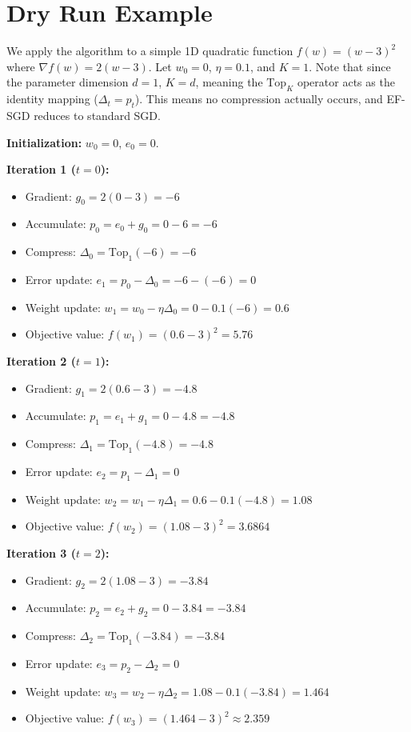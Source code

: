 \documentclass{article}
\begin{document}
\section*{Dry Run Example}
We apply the algorithm to a simple 1D quadratic function $f(w) = (w-3)^2$ where $\nabla f(w) = 2(w-3)$. 
Let $w_0 = 0$, $\eta = 0.1$, and $K=1$. Note that since the parameter dimension $d=1$, $K=d$, meaning the $\text{Top}_K$ operator acts as the identity mapping ($\Delta_t = p_t$). This means no compression actually occurs, and EF-SGD reduces to standard SGD.

\textbf{Initialization:} $w_0 = 0$, $e_0 = 0$.

\textbf{Iteration 1 ($t=0$):}
\begin{itemize}
    \item Gradient: $g_0 = 2(0 - 3) = -6$
    \item Accumulate: $p_0 = e_0 + g_0 = 0 - 6 = -6$
    \item Compress: $\Delta_0 = \text{Top}_1(-6) = -6$
    \item Error update: $e_1 = p_0 - \Delta_0 = -6 - (-6) = 0$
    \item Weight update: $w_1 = w_0 - \eta \Delta_0 = 0 - 0.1(-6) = 0.6$
    \item Objective value: $f(w_1) = (0.6 - 3)^2 = 5.76$
\end{itemize}

\textbf{Iteration 2 ($t=1$):}
\begin{itemize}
    \item Gradient: $g_1 = 2(0.6 - 3) = -4.8$
    \item Accumulate: $p_1 = e_1 + g_1 = 0 - 4.8 = -4.8$
    \item Compress: $\Delta_1 = \text{Top}_1(-4.8) = -4.8$
    \item Error update: $e_2 = p_1 - \Delta_1 = 0$
    \item Weight update: $w_2 = w_1 - \eta \Delta_1 = 0.6 - 0.1(-4.8) = 1.08$
    \item Objective value: $f(w_2) = (1.08 - 3)^2 = 3.6864$
\end{itemize}

\textbf{Iteration 3 ($t=2$):}
\begin{itemize}
    \item Gradient: $g_2 = 2(1.08 - 3) = -3.84$
    \item Accumulate: $p_2 = e_2 + g_2 = 0 - 3.84 = -3.84$
    \item Compress: $\Delta_2 = \text{Top}_1(-3.84) = -3.84$
    \item Error update: $e_3 = p_2 - \Delta_2 = 0$
    \item Weight update: $w_3 = w_2 - \eta \Delta_2 = 1.08 - 0.1(-3.84) = 1.464$
    \item Objective value: $f(w_3) = (1.464 - 3)^2 \approx 2.359$
\end{itemize}
\end{document}
